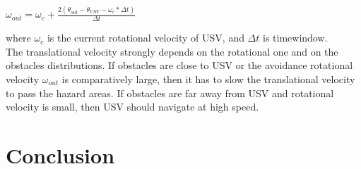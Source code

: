 \documentclass[journal]{IEEEtran}
\begin{document}
      \begin{center}
            $\omega_{out} = \omega_c + \frac{2(\theta_{out} - \theta_{USV} -\omega_c * \Delta t)}{\Delta t}$
      \end{center}
  where $\omega_c$ is the current rotational velocity of USV, and $\Delta t$ is time\-window.\\
  The translational velocity strongly depends on the rotational one and on the obstacles distributions. If obstacles are close to USV or the avoidance rotational velocity $\omega_{out}$ is comparatively large, then it has to slow the translational velocity to pass the hazard areas. If obstacles are far away from USV and rotational velocity is small, then USV should navigate at high speed.
\section{Conclusion} \label{conclusion}



\ifCLASSOPTIONcaptionsoff
  \newpage
\fi


%
%
%







\end{document}
